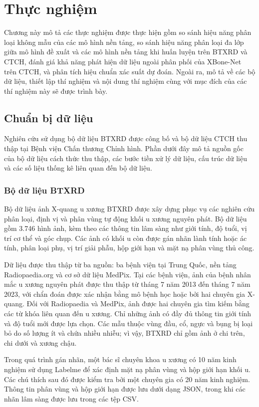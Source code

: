 \chapter{Thực nghiệm}
Chương này mô tả các thực nghiệm được thực hiện gồm so sánh hiệu năng phân loại không mẫu của các mô hình nền tảng, so sánh hiệu năng phân loại đa lớp giữa mô hình đề xuất và các mô hình nền tảng khi huấn luyện trên BTXRD và CTCH, đánh giá khả năng phát hiện dữ liệu ngoài phân phối của XBone-Net trên CTCH, và phân tích hiệu chuẩn xác suất dự đoán. Ngoài ra, mô tả về các bộ dữ liệu, thiết lập thí nghiệm và nội dung thí nghiệm cùng với mục đích của các thí nghiệm này sẽ được trình bày.

\section{Chuẩn bị dữ liệu}
Nghiên cứu sử dụng bộ dữ liệu BTXRD được công bố \cite{Yao2025} và bộ dữ liệu
CTCH thu thập tại Bệnh viện Chấn thương Chỉnh hình. Phần dưới đây mô tả nguồn gốc của bộ dữ liệu cách thức thu thập, các bước tiền xử lý dữ liệu, cấu trúc dữ liệu và các số liệu thống kê liên quan đến bộ dữ liệu.

\subsection{Bộ dữ liệu BTXRD}
Bộ dữ liệu ảnh X-quang u xương BTXRD \cite{Yao2025} được xây dựng phục vụ các nghiên cứu phân loại, định vị và phân vùng tự động khối u xương nguyên phát. Bộ dữ liệu gồm 3.746 hình ảnh, kèm theo các thông tin lâm sàng như giới tính, độ tuổi, vị trí cơ thể và góc chụp. Các ảnh có khối u còn được gán nhãn lành tính hoặc ác tính, phân loại phụ, vị trí giải phẫu, hộp giới hạn và mặt nạ phân vùng thủ công.

Dữ liệu được thu thập từ ba nguồn: ba bệnh viện tại Trung Quốc, nền tảng Radiopaedia.org và cơ sở dữ liệu MedPix. Tại các bệnh viện, ảnh của bệnh nhân mắc u xương nguyên phát được thu thập từ tháng 7 năm 2013 đến tháng 7 năm 2023, với chẩn đoán được xác nhận bằng mô bệnh học hoặc bởi hai chuyên gia X-quang. Đối với Radiopaedia và MedPix, ảnh được hai chuyên gia tìm kiếm bằng các từ khóa liên quan đến u xương. Chỉ những ảnh có đầy đủ thông tin giới tính và độ tuổi mới được lựa chọn. Các mẫu thuộc vùng đầu, cổ, ngực và bụng bị loại bỏ do số lượng ít và chứa nhiều nhiễu; vì vậy, BTXRD chỉ gồm ảnh ở chi trên, chi dưới và xương chậu.

Trong quá trình gán nhãn, một bác sĩ chuyên khoa u xương có 10 năm kinh nghiệm sử dụng Labelme \cite{russell2008labelme} để xác định mặt nạ phân vùng và hộp giới hạn khối u. Các chú thích sau đó được kiểm tra bởi một chuyên gia có 20 năm kinh nghiệm. Thông tin phân vùng và hộp giới hạn được lưu dưới dạng JSON, trong khi các nhãn lâm sàng được lưu trong các tệp CSV.

